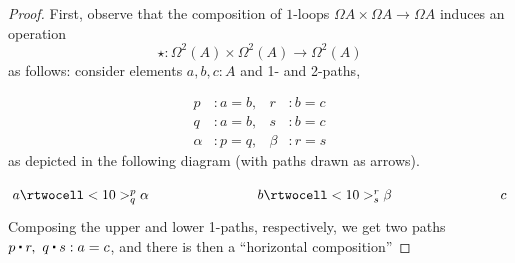 \begin{proof}
First, observe that the composition of $1$-loops $\Omega A\times \Omega A\to \Omega A$ induces an operation \[
\star : \Omega^2(A)\times \Omega^2(A)\to \Omega^2(A)
\]
as follows: consider elements $a, b, c : A$ and 1- and 2-paths, %

\begin{align*}
p &: a = b, &r &: b = c \\
q &: a = b, &s &: b = c \\
\alpha &: p = q, &\beta &: r = s
\end{align*}
%
as depicted in the following diagram (with paths drawn as arrows). %

\[
\xymatrix@+5em{
{a} \rtwocell<10>^p_q{\alpha}
&
{b} \rtwocell<10>^r_s{\beta}
&
{c}
}
\]
Composing the upper and lower 1-paths, respectively, we get two paths $p\ct r,\ q\ct s : a = c$, and there is then a ``horizontal composition'' %


\end{proof}
